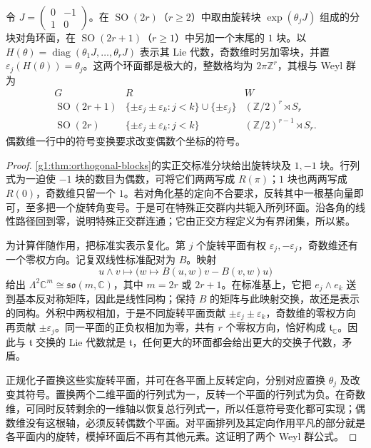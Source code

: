 \begin{proposition}\label{g1:prop:orthogonal-torus-roots}
	令 \(J=\begin{pmatrix}0&-1\\1&0\end{pmatrix}\)。在 \(\operatorname{SO}(2r)\)（\(r\ge2\)）中取由旋转块 \(\exp(\theta_jJ)\) 组成的分块对角环面，在 \(\operatorname{SO}(2r+1)\)（\(r\ge1\)）中另加一个末尾的 \(1\) 块。以 \(H(\theta)=\operatorname{diag}(\theta_1J,\ldots,\theta_rJ)\) 表示其 Lie 代数，奇数维时另加零块，并置 \(\varepsilon_j(H(\theta))=\theta_j\)。这两个环面都是极大的，整数格均为 \(2\pi\mathbb Z^r\)，其根与 Weyl 群为
	\[
		\begin{array}{c|c|c}
		G&R&W\\ \hline
		\operatorname{SO}(2r+1)&\{\pm\varepsilon_j\pm\varepsilon_k:j<k\}\cup\{\pm\varepsilon_j\}&(\mathbb Z/2)^r\rtimes S_r\\
		\operatorname{SO}(2r)&\{\pm\varepsilon_j\pm\varepsilon_k:j<k\}&(\mathbb Z/2)^{r-1}\rtimes S_r.
		\end{array}
	\]
	偶数维一行中的符号变换要求改变偶数个坐标的符号。
\end{proposition}
\begin{proof}
	\cref{g1:thm:orthogonal-blocks}的实正交标准分块给出旋转块及 \(1,-1\) 块。行列式为一迫使 \(-1\) 块的数目为偶数，可将它们两两写成 \(R(\pi)\)；\(1\) 块也两两写成 \(R(0)\)，奇数维只留一个 \(1\)。若对角化基的定向不合要求，反转其中一根基向量即可，至多把一个旋转角变号。于是可在特殊正交群内共轭入所列环面。沿各角的线性路径回到零，说明特殊正交群连通；它由正交方程定义为有界闭集，所以紧。

	为计算伴随作用，把标准实表示复化。第 \(j\) 个旋转平面有权 \(\varepsilon_j,-\varepsilon_j\)，奇数维还有一个零权方向。记复双线性标准配对为 \(B\)。映射
	\[
		u\wedge v\longmapsto\bigl(w\longmapsto B(u,w)v-B(v,w)u\bigr)
	\]
	给出 \(\Lambda^2\mathbb C^m\cong\mathfrak{so}(m,\mathbb C)\)，其中 \(m=2r\) 或 \(2r+1\)。在标准基上，它把 \(e_j\wedge e_k\) 送到基本反对称矩阵，因此是线性同构；保持 \(B\) 的矩阵与此映射交换，故还是表示的同构。外积中两权相加，于是不同旋转平面贡献 \(\pm\varepsilon_j\pm\varepsilon_k\)，奇数维的零权方向再贡献 \(\pm\varepsilon_j\)。同一平面的正负权相加为零，共有 \(r\) 个零权方向，恰好构成 \(\mathfrak t_{\mathbb C}\)。因此与 \(\mathfrak t\) 交换的 Lie 代数就是 \(\mathfrak t\)，任何更大的环面都会给出更大的交换子代数，矛盾。

	正规化子置换这些实旋转平面，并可在各平面上反转定向，分别对应置换 \(\theta_j\) 及改变其符号。置换两个二维平面的行列式为一，反转一个平面的行列式为负。在奇数维，可同时反转剩余的一维轴以恢复总行列式一，所以任意符号变化都可实现；偶数维没有这根轴，必须反转偶数个平面。对平面排列及其定向作用平凡的部分就是各平面内的旋转，模掉环面后不再有其他元素。这证明了两个 Weyl 群公式。
\end{proof}


